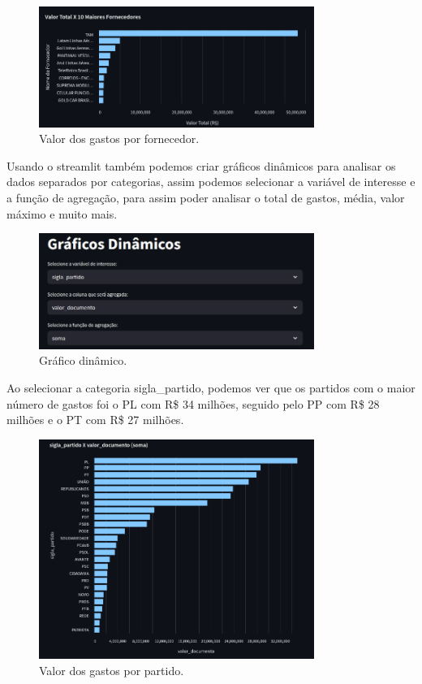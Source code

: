 \documentclass[12pt, a4paper]{article}
\begin{document}
\begin{figure}[!htbp]
	\centering
	\includegraphics[width=0.8\textwidth]{assets/2_plot4.png}
	\caption{Valor dos gastos por fornecedor.}
	\label{fig:criacao_postgresql}
\end{figure}

Usando o streamlit também podemos criar gráficos dinâmicos para analisar os dados separados por categorias, assim podemos selecionar a variável de interesse e a função de agregação, para assim poder analisar o total de gastos, média, valor máximo e muito mais.

\begin{figure}[!htbp]
	\centering
	\includegraphics[width=0.8\textwidth]{assets/2_plot5.png}
	\caption{Gráfico dinâmico.}
	\label{fig:criacao_postgresql}
\end{figure}
\newpage

Ao selecionar a categoria sigla\_partido, podemos ver que os partidos com o maior número de gastos foi o PL com R\$ 34 milhões, seguido pelo PP com R\$ 28 milhões e o PT com R\$ 27 milhões.

\begin{figure}[!htbp]
	\centering
	\includegraphics[width=0.8\textwidth]{assets/2_plot6.png}
	\caption{Valor dos gastos por partido.}
	\label{fig:criacao_postgresql}
\end{figure}
\end{document}
